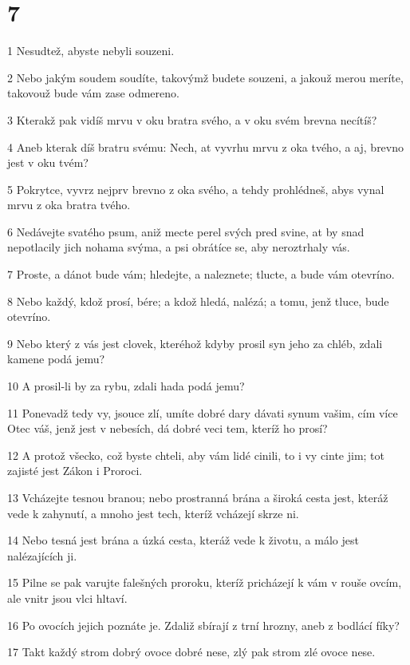 \chapter{7}

\par 1 Nesudtež, abyste nebyli souzeni.
\par 2 Nebo jakým soudem soudíte, takovýmž budete souzeni, a jakouž merou meríte, takovouž bude vám zase odmereno.
\par 3 Kterakž pak vidíš mrvu v oku bratra svého, a v oku svém brevna necítíš?
\par 4 Aneb kterak díš bratru svému: Nech, at vyvrhu mrvu z oka tvého, a aj, brevno jest v oku tvém?
\par 5 Pokrytce, vyvrz nejprv brevno z oka svého, a tehdy prohlédneš, abys vynal mrvu z oka bratra tvého.
\par 6 Nedávejte svatého psum, aniž mecte perel svých pred svine, at by snad nepotlacily jich nohama svýma, a psi obrátíce se, aby neroztrhaly vás.
\par 7 Proste, a dánot bude vám; hledejte, a naleznete; tlucte, a bude vám otevríno.
\par 8 Nebo každý, kdož prosí, bére; a kdož hledá, nalézá; a tomu, jenž tluce, bude otevríno.
\par 9 Nebo který z vás jest clovek, kteréhož kdyby prosil syn jeho za chléb, zdali kamene podá jemu?
\par 10 A prosil-li by za rybu, zdali hada podá jemu?
\par 11 Ponevadž tedy vy, jsouce zlí, umíte dobré dary dávati synum vašim, cím více Otec váš, jenž jest v nebesích, dá dobré veci tem, kteríž ho prosí?
\par 12 A protož všecko, což byste chteli, aby vám lidé cinili, to i vy cinte jim; tot zajisté jest Zákon i Proroci.
\par 13 Vcházejte tesnou branou; nebo prostranná brána a široká cesta jest, kteráž vede k zahynutí, a mnoho jest tech, kteríž vcházejí skrze ni.
\par 14 Nebo tesná jest brána a úzká cesta, kteráž vede k životu, a málo jest nalézajících ji.
\par 15 Pilne se pak varujte falešných proroku, kteríž pricházejí k vám v rouše ovcím, ale vnitr jsou vlci hltaví.
\par 16 Po ovocích jejich poznáte je. Zdaliž sbírají z trní hrozny, aneb z bodlácí fíky?
\par 17 Takt každý strom dobrý ovoce dobré nese, zlý pak strom zlé ovoce nese.
